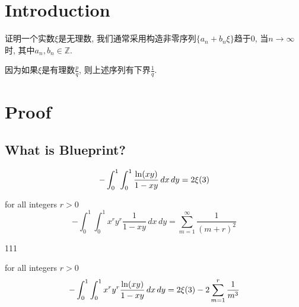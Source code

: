 %

\chapter{Introduction}

证明一个实数$\xi$是无理数, 我们通常采用构造非零序列$\{a_n + b_n\xi\}$趋于$0$, 当$n \rightarrow \infty$时, 其中$a_n, b_n \in \mathbb{Z}$.

因为如果$\xi$是有理数$\frac{p}{q}$, 则上述序列有下界$\frac{1}{q}$.

\chapter{Proof}

\section{What is Blueprint?}

\begin{lemma}\label{integral_zeta_3}
    \[ -\int_{0}^{1}\int_{0}^{1} \frac{{\rm ln}(xy)}{1-xy} \, dx \, dy = 2\xi(3) \]
\end{lemma}

\begin{lemma}\label{I_rr}
    for all integers $r > 0$
    \[ -\int_{0}^{1}\int_{0}^{1} x^ry^r\frac{1}{1-xy} \, dx \, dy = \sum\limits_{m = 1}^{\infty}\frac{1}{(m+r)^2} \]
\end{lemma}

\begin{lemma}\label{interchange_of_limits_sums_derivatives}
    111
\end{lemma}

\begin{lemma}\label{J_rr}
    for all integers $r > 0$
    \[ -\int_{0}^{1}\int_{0}^{1} x^ry^r\frac{{\rm ln}(xy)}{1-xy} \, dx \, dy = 2\xi(3) - 2 \sum\limits_{m = 1}^{r}\frac{1}{m^3} \]
\end{lemma}


